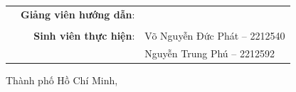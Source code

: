 \begin{titlepage}
  \begin{table}[h]
    \begin{tabular}{l r l}
      & \Large \textbf{Giảng viên hướng dẫn}: & \Large \Lecturer{}\\
      &              & \Large \Lecturern{}\\

      & \Large \textbf{Sinh viên thực hiện}: & \Large Võ Nguyễn Đức Phát -- 2212540 \\
      & & \Large Nguyễn Trung Phú -- 2212592 \\

    \end{tabular}
  \end{table}

  \vspace{2cm}

  \begin{center}
    {\large  Thành phố Hồ Chí Minh, \SubmitTime{}}
  \end{center}

\end{titlepage}
